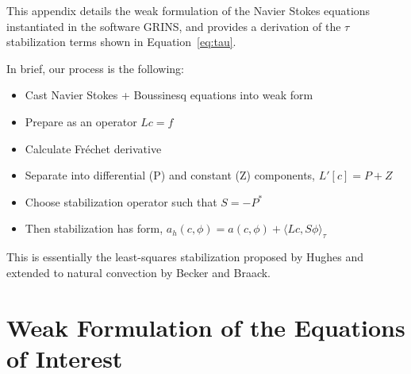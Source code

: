 \label{app:stab}

This appendix details the weak formulation of the Navier Stokes
equations instantiated in the software GRINS, and provides a
derivation of the $\tau$ stabilization terms shown in
Equation~\ref{eq:tau}.  

In brief, our process is the following: 

\begin{itemize}
 \item Cast Navier Stokes + Boussinesq equations into weak form
 \item Prepare as an operator $Lc=f$
 \item Calculate Fr\'echet derivative
 \item Separate into differential (P) and constant (Z) components,
       $L'[c] = P + Z$
 \item Choose stabilization operator such that $S = -P^*$
 \item Then stabilization has form, $a_h(c,\phi) = a(c,\phi) + \langle
       Lc,S\phi \rangle_\tau$
\end{itemize}

This is essentially the least-squares stabilization proposed by Hughes
and extended to natural convection by Becker and Braack. 

%
%

\section{Weak Formulation of the Equations of Interest}

